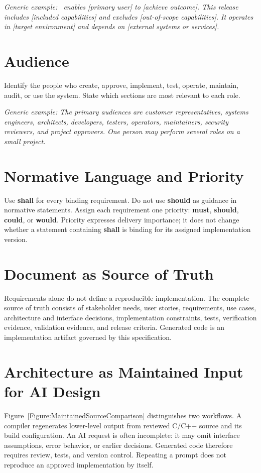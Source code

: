 \textit{Generic example: \ProjectName\ enables [primary user] to [achieve
outcome]. This release includes [included capabilities] and excludes
[out-of-scope capabilities]. It operates in [target environment] and depends
on [external systems or services].}

\section{Audience}
Identify the people who create, approve, implement, test, operate, maintain,
audit, or use the system. State which sections are most relevant to each role.

\textit{Generic example: The primary audiences are customer representatives,
systems engineers, architects, developers, testers, operators, maintainers,
security reviewers, and project approvers. One person may perform several
roles on a small project.}

\section{Normative Language and Priority}
Use \textbf{shall} for every binding requirement. Do not use \textbf{should} as
guidance in normative statements. Assign each requirement one priority:
\textbf{\gls{must}}, \textbf{\gls{should}}, \textbf{\gls{could}}, or
\textbf{\gls{would}}. Priority expresses delivery importance; it does not change
whether a statement containing \textbf{shall} is binding for its assigned
implementation version.

\section{Document as Source of Truth}
Requirements alone do not define a reproducible implementation. The complete
source of truth consists of stakeholder needs, user stories, requirements, use
cases, architecture and interface decisions, implementation constraints,
tests, verification evidence, validation evidence, and release criteria.
Generated code is an implementation artifact governed by this specification.

\section{Architecture as Maintained Input for AI Design}
\label{Section:ArchitectureAIDesign}
Figure~\ref{Figure:MaintainedSourceComparison} distinguishes two workflows.
A compiler regenerates lower-level output from reviewed C/C++ source and its
build configuration. An AI request is often incomplete: it may omit interface
assumptions, error behavior, or earlier decisions. Generated code therefore
requires review, tests, and version control. Repeating a prompt does not
reproduce an approved implementation by itself.

